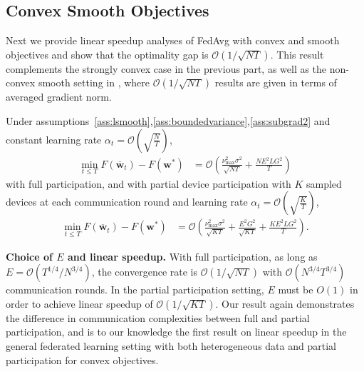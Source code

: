 \subsection{Convex Smooth Objectives}
Next we provide linear speedup analyses of FedAvg with convex and
smooth objectives and show that the optimality gap is $\mathcal{O}(1/\sqrt{NT})$. 
This result complements the strongly convex case in the previous part, as well as the non-convex
smooth setting in \cite{jiang2018linear,yu2019parallel,haddadpour2019convergence},
where $\mathcal{O}(1/\sqrt{NT})$ results are given in terms of averaged
gradient norm. 
\begin{theorem}
	\label{thm:SGD_cvx}Under assumptions~\ref{ass:lsmooth},\ref{ass:boundedvariance},\ref{ass:subgrad2} and constant learning
	rate $\alpha_{t}=\mathcal{O}(\sqrt{\frac{N}{T}})$, 
	\begin{align*}
	\min_{t\leq T}F(\overline{\mathbf{w}}_{t})-F(\mathbf{w}^{\ast}) & =\mathcal{O}\left(\frac{\nu_{\max}^{2}\sigma^{2}}{\sqrt{NT}}+\frac{NE^{2}LG^{2}}{T}\right)
	\end{align*}
	with full participation, and with partial device participation with $K$ sampled devices at
	each communication round and learning rate $\alpha_{t}=\mathcal{O}(\sqrt{\frac{K}{T}})$,
	\begin{align*}
	\min_{t\leq T}F(\overline{\mathbf{w}}_{t})-F(\mathbf{w}^{\ast}) & =\mathcal{O}\left(\frac{\nu_{\max}^{2}\sigma^{2}}{\sqrt{KT}}+\frac{E^{2}G^{2}}{\sqrt{KT}}+\frac{KE^{2}LG^{2}}{T}\right).
	\end{align*}
\end{theorem}
%
\textbf{Choice of $E$ and linear speedup. }With full participation,
as long as $E=\mathcal{O}(T^{1/4}/N^{3/4})$, the convergence
rate is $\mathcal{O}(1/\sqrt{NT})$ with $\mathcal{O}(N^{3/4}T^{3/4})$
communication rounds. In the partial participation setting, $E$ must
be $O(1)$ in order to achieve linear speedup of $\mathcal{O}(1/\sqrt{KT})$.
Our result again demonstrates the difference in communication complexities
between full and partial participation, and is to our knowledge the
first result on linear speedup in the general federated learning setting
with both heterogeneous data and partial participation for convex objectives.
\begin{comment}
\textbf{Learning rate. }The learning rate now depends on the final
horizon $T$ of the convergence statement, whereas in the strongly
convex case the learning rate decays as $\mathcal{O}(1/t)$. Such
a requirement $\alpha_{t}=\mathcal{O}(\sqrt{N/T})$ also presents
in \cite{haddadpour2019convergence,yu2019parallel} on non-convex
problems with $\mathcal{O}(1/\sqrt{NT})$ linear speedup convergence results. 
\end{comment}